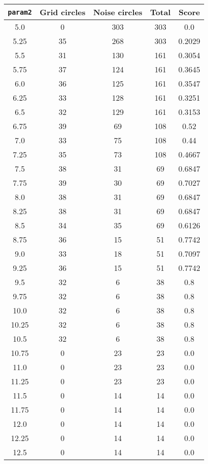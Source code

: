 \documentclass[letterpaper, 12pt]{article}
\begin{document}
\begin{longtable}{|c|c|c|c|c|}
\hline
\textbf{\texttt{param2}} & \textbf{Grid circles} & \textbf{Noise circles} & \textbf{Total} & \textbf{Score} \\
\hline
5.0 & 0 & 303 & 303 & 0.0 \\
\hline
5.25 & 35 & 268 & 303 & 0.2029 \\
\hline
5.5 & 31 & 130 & 161 & 0.3054 \\
\hline
5.75 & 37 & 124 & 161 & 0.3645 \\
\hline
6.0 & 36 & 125 & 161 & 0.3547 \\
\hline
6.25 & 33 & 128 & 161 & 0.3251 \\
\hline
6.5 & 32 & 129 & 161 & 0.3153 \\
\hline
6.75 & 39 & 69 & 108 & 0.52 \\
\hline
7.0 & 33 & 75 & 108 & 0.44 \\
\hline
7.25 & 35 & 73 & 108 & 0.4667 \\
\hline
7.5 & 38 & 31 & 69 & 0.6847 \\
\hline
7.75 & 39 & 30 & 69 & 0.7027 \\
\hline
8.0 & 38 & 31 & 69 & 0.6847 \\
\hline
8.25 & 38 & 31 & 69 & 0.6847 \\
\hline
8.5 & 34 & 35 & 69 & 0.6126 \\
\hline
8.75 & 36 & 15 & 51 & 0.7742 \\
\hline
9.0 & 33 & 18 & 51 & 0.7097 \\
\hline
9.25 & 36 & 15 & 51 & 0.7742 \\
\hline
9.5 & 32 & 6 & 38 & 0.8 \\
\hline
9.75 & 32 & 6 & 38 & 0.8 \\
\hline
10.0 & 32 & 6 & 38 & 0.8 \\
\hline
10.25 & 32 & 6 & 38 & 0.8 \\
\hline
10.5 & 32 & 6 & 38 & 0.8 \\
\hline
10.75 & 0 & 23 & 23 & 0.0 \\
\hline
11.0 & 0 & 23 & 23 & 0.0 \\
\hline
11.25 & 0 & 23 & 23 & 0.0 \\
\hline
11.5 & 0 & 14 & 14 & 0.0 \\
\hline
11.75 & 0 & 14 & 14 & 0.0 \\
\hline
12.0 & 0 & 14 & 14 & 0.0 \\
\hline
12.25 & 0 & 14 & 14 & 0.0 \\
\hline
12.5 & 0 & 14 & 14 & 0.0 \\

\end{longtable}
\end{document}
